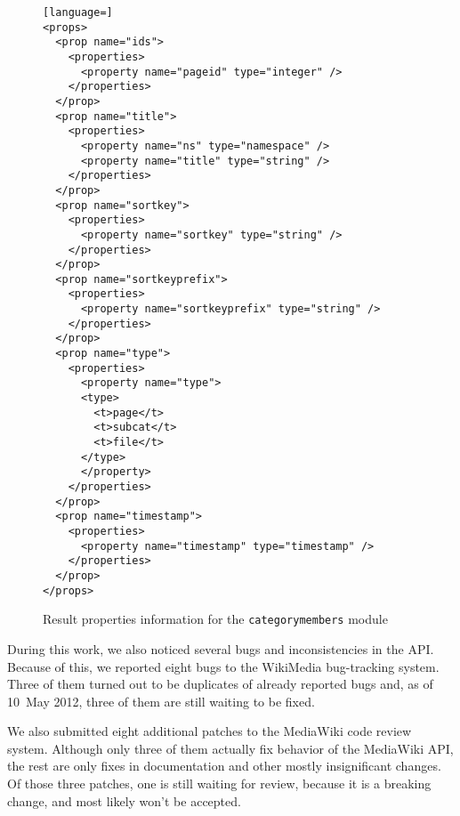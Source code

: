 \begin{figure}[p]

\begin{lstlisting}[language=]
<props>
  <prop name="ids">
    <properties>
      <property name="pageid" type="integer" />
    </properties>
  </prop>
  <prop name="title">
    <properties>
      <property name="ns" type="namespace" />
      <property name="title" type="string" />
    </properties>
  </prop>
  <prop name="sortkey">
    <properties>
      <property name="sortkey" type="string" />
    </properties>
  </prop>
  <prop name="sortkeyprefix">
    <properties>
      <property name="sortkeyprefix" type="string" />
    </properties>
  </prop>
  <prop name="type">
    <properties>
      <property name="type">
      <type>
        <t>page</t>
        <t>subcat</t>
        <t>file</t>
      </type>
      </property>
    </properties>
  </prop>
  <prop name="timestamp">
    <properties>
      <property name="timestamp" type="timestamp" />
    </properties>
  </prop>
</props>
\end{lstlisting}

\caption{Result properties information for the \texttt{categorymembers} module}
\label{paraminfo props}
\end{figure}

During this work, we also noticed several bugs and inconsistencies in the \ac{API}.
Because of this, we reported eight bugs to the WikiMedia bug-tracking system.
Three of them turned out to be duplicates of already reported bugs and,
as of 10~May 2012, three of them are still waiting to be fixed.

We also submitted eight additional patches to the MediaWiki code review system.
Although only three of them actually fix behavior of the MediaWiki \ac{API},
the rest are only fixes in documentation and other mostly insignificant changes.
Of those three patches, one is still waiting for review, because it is a breaking change,
and most likely won't be accepted.